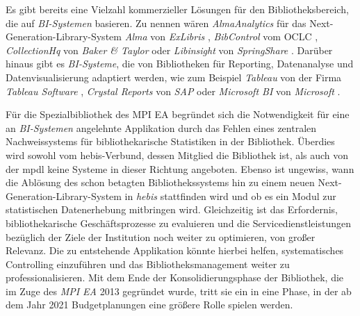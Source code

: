 Es gibt bereits eine Vielzahl kommerzieller Lösungen für den Bibliotheksbereich, die auf \textit{\acrshort{BI}-Systemen} basieren.
Zu nennen wären \textit{AlmaAnalytics} für das Next-Generation-Library-System \textit{Alma} von \textit{ExLibris} \cite{ex_libris_alma_2020},
\textit{BibControl} vom \acrfull{OCLC} \cite{oclc_bibcontrol_2020},
\textit{CollectionHq} von \textit{Baker \& Taylor}\cite{baker__taylor_select_2020} oder \textit{Libinsight} von \textit{SpringShare} \cite{springShare_libinsight_2020}.
Darüber hinaus gibt es \textit{\acrlong{BI}-Systeme}, die von Bibliotheken für Reporting, Datenanalyse und Datenvisualisierung adaptiert werden,
wie zum Beispiel \textit{Tableau} von der Firma \textit{Tableau Software} \cite{tableau_software_software_2020},
\textit{Crystal Reports} von \textit{SAP} \cite{sap_pixel-perfect_2020} oder \textit{Microsoft BI} von \textit{Microsoft} \cite{microsoft_datenvisualisierung_2020}.

Für die Spezialbibliothek des \acrfull{MPI EA} begründet sich die Notwendigkeit für eine an \textit{\acrshort{BI}-Systemen} angelehnte Applikation durch das
Fehlen eines zentralen Nachweissystems für bibliothekarische
Statistiken in der Bibliothek. Überdies wird sowohl vom \acrfull{hebis}-Verbund, dessen Mitglied die Bibliothek ist, als auch 
von der \acrfull{mpdl} keine Systeme in dieser Richtung angeboten. Ebenso ist ungewiss, wann die Ablösung des schon betagten Bibliothekssystems hin zu 
einem neuen Next-Generation-Library-System in \textit{\acrshort{hebis}} stattfinden wird und ob
es ein Modul zur statistischen Datenerhebung mitbringen wird. 
Gleichzeitig ist das Erfordernis, bibliothekarische Geschäftsprozesse zu evaluieren und die
Servicedienstleistungen bezüglich der Ziele der Institution noch weiter zu
optimieren, von großer Relevanz. 
Die zu entstehende Applikation könnte hierbei helfen, systematisches Controlling einzuführen und das
Bibliotheksmanagement weiter zu professionalisieren.
Mit dem Ende der Konsolidierungsphase der
Bibliothek, die im Zuge des \textit{\acrshort{MPI EA}} 2013 gegründet wurde, tritt sie ein in eine Phase, in der ab dem Jahr
2021 Budgetplanungen eine größere Rolle spielen werden.


